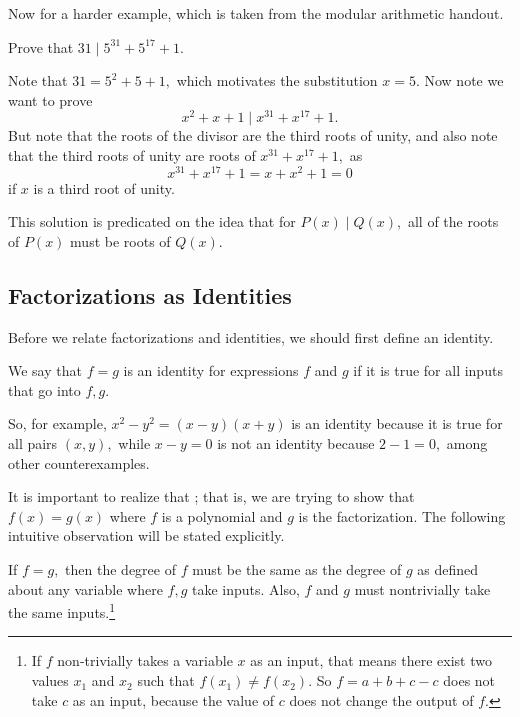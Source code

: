 \documentclass{article}
\begin{document}
Now for a harder example, which is taken from the modular arithmetic handout.

\begin{exam}
Prove that $31\mid 5^{31}+5^{17}+1.$
\end{exam}

\begin{sol}
Note that $31=5^2+5+1,$ which motivates the substitution $x=5.$ Now note we want to prove
\[x^2+x+1\mid x^{31}+x^{17}+1.\]
But note that the roots of the divisor are the third roots of unity, and also note that the third roots of unity are roots of $x^{31}+x^{17}+1,$ as
\[x^{31}+x^{17}+1=x+x^2+1=0\]
if $x$ is a third root of unity.
\end{sol}
This solution is predicated on the idea that for $P(x)\mid Q(x),$ all of the roots of $P(x)$ must be roots of $Q(x).$

\subsection{Factorizations as Identities}

Before we relate factorizations and identities, we should first define an identity.

\begin{defi}[Identity]
We say that $f=g$ is an identity for expressions $f$ and $g$ if it is true for all inputs that go into $f,g$.
\end{defi}

So, for example, $x^2-y^2=(x-y)(x+y)$ is an identity because it is true for all pairs $(x,y),$ while $x-y=0$ is not an identity because $2-1=0,$ among other counterexamples.

It is important to realize that ; that is, we are trying to show that $f(x)=g(x)$ where $f$ is a polynomial and $g$ is the factorization. The following intuitive observation will be stated explicitly.

\begin{theo}
If $f=g,$ then the degree of $f$ must be the same as the degree of $g$ as defined about any variable where $f,g$ take inputs. Also, $f$ and $g$ must nontrivially take the same inputs.\footnote{If $f$ non-trivially takes a variable $x$ as an input, that means there exist two values $x_1$ and $x_2$ such that $f(x_1)\neq f(x_2).$ So $f=a+b+c-c$ does not take $c$ as an input, because the value of $c$ does not change the output of $f.$}
\end{theo}
\end{document}
